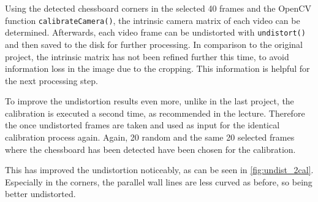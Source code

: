 Using the detected chessboard corners in the selected 40 frames and the OpenCV function \texttt{calibrateCamera()}, the intrinsic camera matrix of each video can be determined. Afterwards, each video frame can be undistorted with \texttt{undistort()} and then saved to the disk for further processing. In comparison to the original project, the intrinsic matrix has not been refined further this time, to avoid information loss in the image due to the cropping. This information is helpful for the next processing step.

To improve the undistortion results even more, unlike in the last project, the calibration is executed a second time, as recommended in the lecture. Therefore the once undistorted frames are taken and used as input for the identical calibration process again. Again, 20 random and the same 20 selected frames where the chessboard has been detected have been chosen for the calibration.

This has improved the undistortion noticeably, as can be seen in \autoref{fig:undist_2cal}. Especially in the corners, the parallel wall lines are less curved as before, so being better undistorted.

